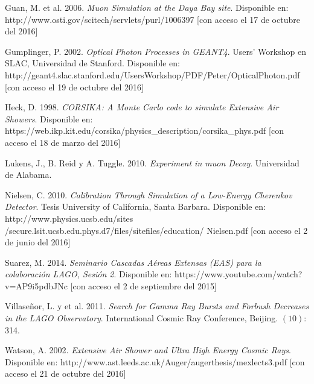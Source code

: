 \documentclass{book}
\begin{document}
\begin{thebibliography}{9}
 Guan, M. et al. 2006.  \textit{Muon Simulation at the Daya Bay site}. Disponible en: \\http://www.osti.gov/scitech/servlets/purl/1006397 [con acceso el 17 de octubre del 2016]

 Gumplinger, P. 2002.  \textit{Optical Photon Processes in GEANT4}. Users' Workshop en SLAC, Universidad de Stanford. Disponible en: http://geant4.slac.stanford.edu/UsersWorkshop/PDF/Peter/OpticalPhoton.pdf [con acceso el 19 de octubre del 2016]

 Heck, D. 1998. \textit{CORSIKA: A Monte Carlo code to simulate Extensive Air Showers}. Disponible en: https://web.ikp.kit.edu/corsika/physics\_description/corsika\_phys.pdf [con acceso el 18 de marzo del 2016]

 Lukens, J., B. Reid y A. Tuggle.  2010. \textit{Experiment in muon Decay}. Universidad de Alabama.

 Nielsen, C.  2010. \textit{Calibration Through Simulation of a Low-Energy Cherenkov Detector}. Tesis University of California, Santa Barbara. Disponible en: http://www.physics.ucsb.edu/sites\\/secure.lsit.ucsb.edu.phys.d7/files/sitefiles/education/ Nielsen.pdf [con acceso el 2 de junio del 2016]

 Suarez, M. 2014. \textit{Seminario Cascadas A\'ereas Extensas (EAS) para la colaboraci\'on LAGO, Sesi\'on 2}. Disponible en: https://www.youtube.com/watch?v=AP9i5pdbJNc [con acceso el 2 de septiembre del 2015]

 Villase\~nor, L. y et al. 2011. \textit{Search for Gamma Ray Bursts and Forbush Decreases in the LAGO Observatory}. International Cosmic Ray Conference, Beijing. $(10)$: 314.

 Watson, A. 2002. \textit{Extensive Air Shower and Ultra High Energy Cosmic Rays}. Disponible en: http://www.ast.leeds.ac.uk/Auger/augerthesis/mexlects3.pdf [con acceso el 21 de octubre del 2016]


\end{thebibliography}



\end{document}
